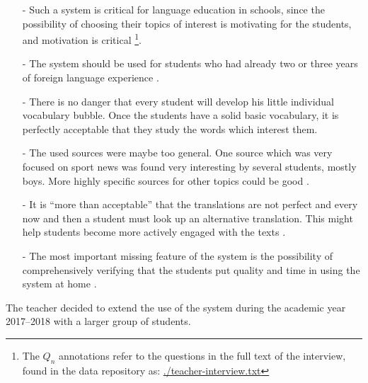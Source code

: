 \begin{itemize}

	\item [-] Such a system is critical for language education in schools, since the possibility of choosing their topics of interest is motivating for the students, and motivation is critical \footnote
		{The $Q_n$ annotations refer to the questions in the full text of the interview, found  in the data repository as: \href{https://github.com/zeeguu-ecosystem/CHI18-Paper/blob/master/data/teacher-interview.txt}{./teacher-interview.txt}}. 

	\item [-]The system should be used for students who had already two or three years of foreign language experience . 

	\item [-]There is no danger that every student will develop his little individual vocabulary bubble. Once the students have a solid basic vocabulary, it is perfectly acceptable that they study the words which interest them. 

	\item [-]The used sources were maybe too general. One source which was very focused on sport news was found very interesting by several students, mostly boys. More highly specific sources for other topics could be good .



	\item [-] It is ``more than acceptable'' that the translations are not perfect and every now and then a student must look up an alternative translation. This might help students become more actively engaged with the texts . 


	\item [-]The most important missing feature of the system is the possibility of comprehensively verifying that the students put quality and time in using the system at home .

\end{itemize}


The teacher decided to extend the use of the system during the academic year 2017--2018 with a larger group of students. 
